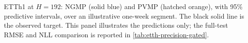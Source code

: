 \caption{ETTh1 at \(H=192\): NGMP (solid blue) and PVMP (hatched orange), with 95\% predictive intervals, over an illustrative one-week segment. The black solid line is the observed target. This panel illustrates the predictions only; the full-test RMSE and NLL comparison is reported in \cref{tab:etth-precision-gated}.}
